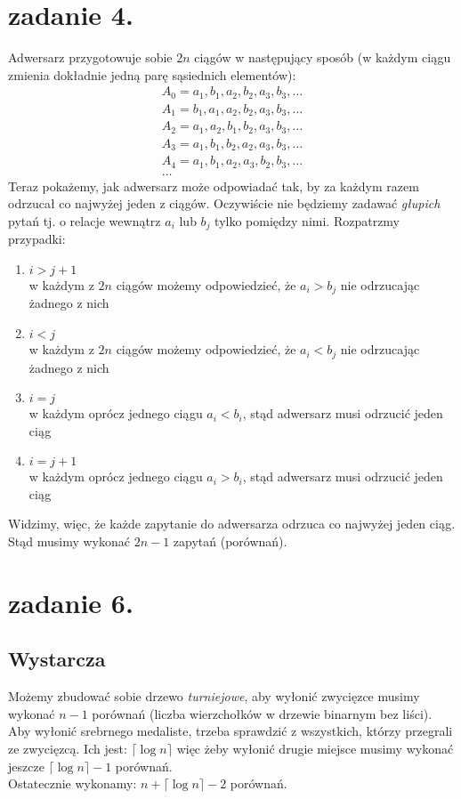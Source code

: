 \documentclass{article}
\begin{document}
\section{zadanie 4.}
Adwersarz przygotowuje sobie $2n$ ciągów w następujący sposób (w każdym ciągu zmienia dokładnie jedną parę sąsiednich elementów):
\begin{align*}
A_0 = a_1,b_1,a_2,b_2,a_3,b_3,\ldots\\
A_1 = b_1,a_1,a_2,b_2,a_3,b_3,\ldots\\
A_2 = a_1,a_2,b_1,b_2,a_3,b_3,\ldots\\
A_3 = a_1,b_1,b_2,a_2,a_3,b_3,\ldots\\
A_4 = a_1,b_1,a_2,a_3,b_2,b_3,\ldots\\
\ldots
\end{align*}
Teraz pokażemy, jak adwersarz może odpowiadać tak, by za każdym razem odrzucał co najwyżej jeden z ciągów. Oczywiście nie będziemy zadawać \textit{głupich} pytań tj. o relacje wewnątrz $a_i$ lub $b_j$ tylko pomiędzy nimi. Rozpatrzmy przypadki:
\begin{enumerate}
    \item $i > j+1 $\\
    w każdym z $2n$ ciągów możemy odpowiedzieć, że $a_i > b_j$ nie odrzucając żadnego z nich
    \item $i < j $\\
    w każdym z $2n$ ciągów możemy odpowiedzieć, że $a_i < b_j$ nie odrzucając żadnego z nich
    \item $i = j $\\
    w każdym oprócz jednego ciągu $a_i < b_i$, stąd adwersarz musi odrzucić jeden ciąg
    \item $i = j+1 $\\
    w każdym oprócz jednego ciągu $a_i > b_i$, stąd adwersarz musi odrzucić jeden ciąg
\end{enumerate}
Widzimy, więc, że każde zapytanie do adwersarza odrzuca co najwyżej jeden ciąg. Stąd musimy wykonać $2n -1$ zapytań (porównań).
\clearpage
\section{zadanie 6.}
\subsection*{Wystarcza}
Możemy zbudować sobie drzewo \textit{turniejowe}, aby wyłonić zwycięzce musimy wykonać $n-1$ porównań (liczba wierzchołków w drzewie binarnym bez liści). Aby wyłonić srebrnego medaliste, trzeba sprawdzić z wszystkich, którzy przegrali ze zwycięzcą. Ich jest: $\lceil{\log{n}}\rceil$ więc żeby wyłonić drugie miejsce musimy wykonać jeszcze $\lceil{\log{n}}\rceil - 1$ porównań.\\Ostatecznie wykonamy: $n + \lceil{\log{n}}\rceil - 2$ porównań.
\end{document}
